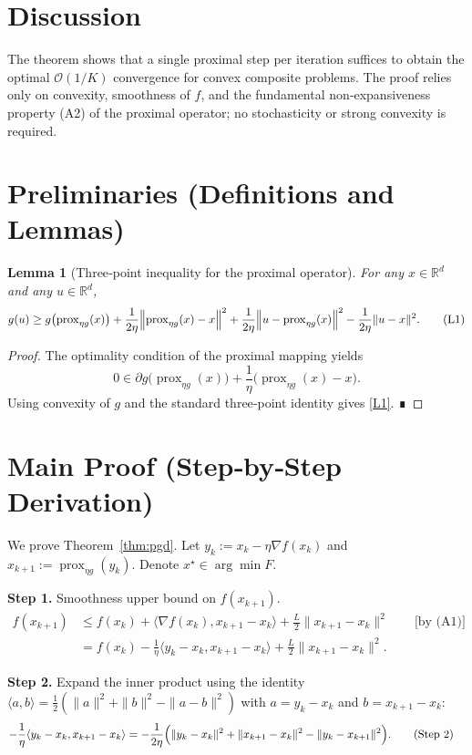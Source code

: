 \documentclass{article}
\newtheorem{lemma}{Lemma}[section]
\begin{document}
\section*{Discussion}
The theorem shows that a single proximal step per iteration suffices to obtain the optimal $\mathcal{O}(1/K)$ convergence for convex composite problems. The proof relies only on convexity, smoothness of $f$, and the fundamental non‑expansiveness property (A2) of the proximal operator; no stochasticity or strong convexity is required.

\newpage
\section*{Preliminaries (Definitions and Lemmas)}
\begin{lemma}[Three‑point inequality for the proximal operator]\label{lem:three}
For any $x\in\mathbb{R}^d$ and any $u\in\mathbb{R}^d$,
\[
g(u)\ge g\bigl(\operatorname{prox}_{\eta g}(x)\bigr)
+ \frac{1}{2\eta}\Bigl\|\operatorname{prox}_{\eta g}(x)-x\Bigr\|^2
+ \frac{1}{2\eta}\Bigl\|u-\operatorname{prox}_{\eta g}(x)\Bigr\|^2
- \frac{1}{2\eta}\|u-x\|^2 .
\tag{L1}
\]
\end{lemma}
\begin{proof}
The optimality condition of the proximal mapping yields
\[
0\in \partial g\bigl(\operatorname{prox}_{\eta g}(x)\bigr)
+\frac{1}{\eta}\bigl(\operatorname{prox}_{\eta g}(x)-x\bigr).
\]
Using convexity of $g$ and the standard three‑point identity gives \eqref{L1}. ∎
\end{proof}

\section*{Main Proof (Step‑by‑Step Derivation)}
We prove Theorem~\ref{thm:pgd}. Let $y_k:=x_k-\eta\nabla f(x_k)$ and $x_{k+1}:=\operatorname{prox}_{\eta g}(y_k)$. Denote $x^\star\in\arg\min F$.

\bigskip
\noindent\textbf{Step 1.} Smoothness upper bound on $f(x_{k+1})$.
\begin{align}
f(x_{k+1})
&\le f(x_k)+\langle\nabla f(x_k),x_{k+1}-x_k\rangle
   +\frac{L}{2}\|x_{k+1}-x_k\|^2
   \qquad\text{[by (A1)]} \nonumber\\
&= f(x_k)-\frac{1}{\eta}\langle y_k-x_k,x_{k+1}-x_k\rangle
   +\frac{L}{2}\|x_{k+1}-x_k\|^2. \tag{Step 1}
\end{align}

\noindent\textbf{Step 2.} Expand the inner product using the identity
$\langle a,b\rangle=\frac12(\|a\|^2+\|b\|^2-\|a-b\|^2)$ with
$a=y_k-x_k$ and $b=x_{k+1}-x_k$:
\begin{align}
-\frac{1}{\eta}\langle y_k-x_k,x_{k+1}-x_k\rangle
&= -\frac{1}{2\eta}\Bigl(\|y_k-x_k\|^2+\|x_{k+1}-x_k\|^2
      -\|y_k-x_{k+1}\|^2\Bigr). \tag{Step 2}
\end{align}
\end{document}
